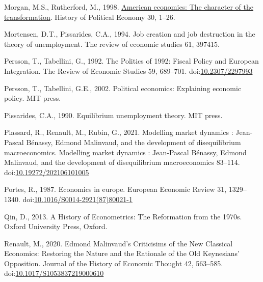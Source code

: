 \documentclass[]{elsarticle} %
\newlength{\cslhangindent}
\newlength{\cslentryspacingunit} %
\newenvironment{CSLReferences}[2] %
 {%
  \setlength{\parindent}{0pt}
  \ifodd #1
  \let\oldpar\par
  \def\par{\hangindent=\cslhangindent\oldpar}
  \fi
  \setlength{\parskip}{#2\cslentryspacingunit}
 }%
 {}
\begin{document}
\begin{CSLReferences}{1}{0}
\leavevmode{}%
Morgan, M.S., Rutherford, M., 1998.
\href{http://search.ebscohost.com/login.aspx?direct=true\&db=bth\&AN=7752144\&lang=fr\&site=ehost-live}{American
economics: The character of the transformation}. History of Political
Economy 30, 1--26.

\leavevmode{}%
Mortensen, D.T., Pissarides, C.A., 1994. Job creation and job
destruction in the theory of unemployment. The review of economic
studies 61, 397415.

\leavevmode{}%
Persson, T., Tabellini, G., 1992. The {Politics} of 1992: {Fiscal
Policy} and {European Integration}. The Review of Economic Studies 59,
689--701. doi:\href{https://doi.org/10.2307/2297993}{10.2307/2297993}

\leavevmode{}%
Persson, T., Tabellini, G.E., 2002. Political economics: Explaining
economic policy. {MIT press}.

\leavevmode{}%
Pissarides, C.A., 1990. Equilibrium unemployment theory. MIT press.

\leavevmode{}%
Plassard, R., Renault, M., Rubin, G., 2021. Modelling market dynamics :
{Jean-Pascal Bénassy}, {Edmond Malinvaud}, and the development of
disequilibrium macroeconomics. Modelling market dynamics : Jean-Pascal
Bénassy, Edmond Malinvaud, and the development of disequilibrium
macroeconomics 83--114.
doi:\href{https://doi.org/10.19272/202106101005}{10.19272/202106101005}

\leavevmode{}%
Portes, R., 1987. Economics in europe. European Economic Review 31,
1329--1340.
doi:\href{https://doi.org/10.1016/S0014-2921(87)80021-1}{10.1016/S0014-2921(87)80021-1}

\leavevmode{}%
Qin, D., 2013. {A History of Econometrics: The Reformation from the
1970s}. {Oxford University Press}, {Oxford}.

\leavevmode{}%
Renault, M., 2020. Edmond {Malinvaud}'s {Criticisims} of the {New
Classical Economics}: {Restoring} the {Nature} and the {Rationale} of
the {Old Keynesians}' {Opposition}. Journal of the History of Economic
Thought 42, 563--585.
doi:\href{https://doi.org/10.1017/S1053837219000610}{10.1017/S1053837219000610}


\end{CSLReferences}
\end{document}

